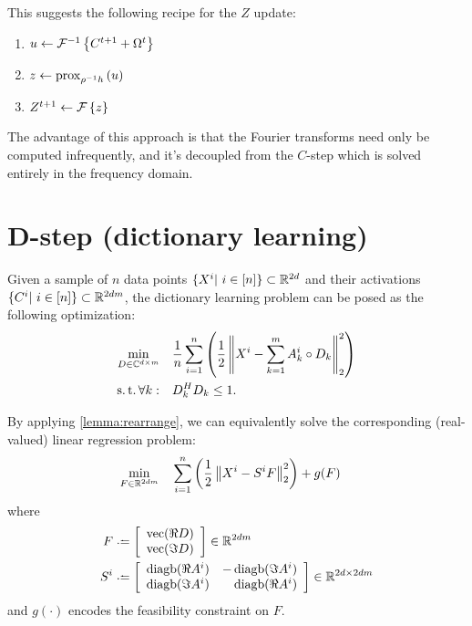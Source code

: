 \documentclass{article}
\DeclareMathOperator{\diagb}{diagb}
\DeclareMathOperator{\vectorize}{vec}
\renewcommand{\C}{\ensuremath{\mathbb{C}}}
\begin{document}
This suggests the following recipe for the $Z$ update:
\begin{enumerate}
\item $u \leftarrow \mathcal{F}^{-1}\left\{C^{t+1} + \Omega^t \right\}$
\item $z \leftarrow \operatorname{prox}_{\rho^{-1}h} \left(u\right)$
\item $Z^{t+1} \leftarrow \mathcal{F}\left\{z\right\}$
\end{enumerate}
The advantage of this approach is that the Fourier transforms need only be computed infrequently, and it's decoupled from
the $C$-step which is solved entirely in the frequency domain.

\section{D-step (dictionary learning)}
Given a sample of $n$ data points $\{X^i |~ i \in [n] \} \subset \mathbb{R}^{2d}$ and their activations 
$\{C^i |~ i \in [n] \} \subset \mathbb{R}^{2dm}$, the dictionary learning problem can be posed as the following
optimization:
\begin{align}
\min_{D\in \C^{d\times m}} \quad&\frac{1}{n} \sum_{i=1}^n \left(\frac{1}{2} \left\|X^i - \sum_{k=1}^m A^i_k
\circ D_k \right\|_2^2\right)\label{eq:siscd}\\
\suchthat \forall k: \quad & D_k^H D_k \leq 1.\notag
\end{align}

By applying \autoref{lemma:rearrange}, we can equivalently solve the corresponding (real-valued) linear regression problem:
\begin{align}
\min_{F\in \mathbb{R}^{2dm}} \quad& \sum_{i=1}^n \left(\frac{1}{2} \left\|X^i - S^i F\right\|_2^2\right) + g(F)\label{eq:siscdmf}
\end{align}
where
\begin{align*}
F &\defeq \left[\begin{array}{c}
\vectorize(\Re D)\\
\vectorize(\Im D)
\end{array}\right] \in \R^{2dm}\\
S^i &\defeq \left[\begin{array}{rr}
\diagb(\Re A^i) & -\diagb(\Im A^i)\\
\diagb(\Im A^i) & \diagb(\Re A^i)
\end{array}\right] \in \R^{2d \times 2dm}
\end{align*}
and $g(\cdot)$ encodes the feasibility constraint on $F$.
\end{document}
